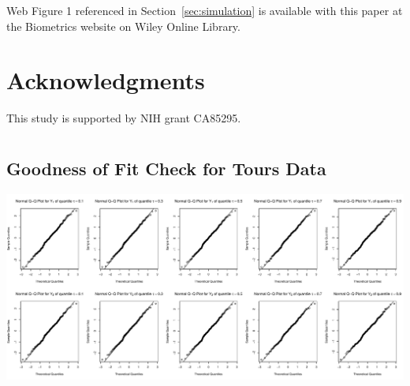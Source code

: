 \documentclass[useAMS,usenatbib,referee]{biom}
\begin{document}
Web Figure 1 referenced in Section~\ref{sec:simulation} is available
with this paper at the Biometrics website on Wiley Online Library.
\vspace*{-8pt}



\section*{Acknowledgments}

This study is supported by NIH grant CA85295.






\appendix
\section{}

\subsection{Goodness of Fit Check for Tours Data}
\label{sec:goftours}

\centerline{\includegraphics[scale = .4 ]{../image/ToursGoF}}

\label{lastpage}
\end{document}
